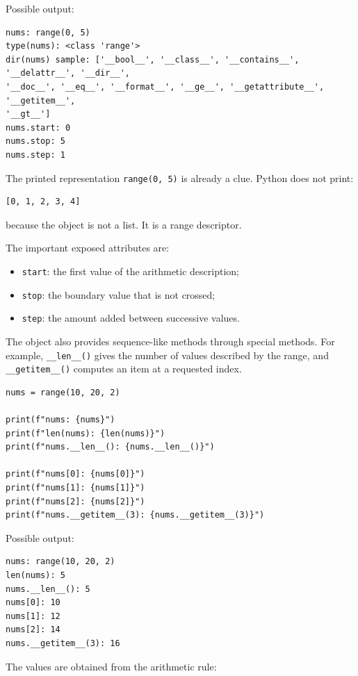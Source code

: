 \documentclass[a4paper,twoside]{report}
\begin{document}
Possible output:

\begin{verbatim}
nums: range(0, 5)
type(nums): <class 'range'>
dir(nums) sample: ['__bool__', '__class__', '__contains__', '__delattr__', '__dir__',
'__doc__', '__eq__', '__format__', '__ge__', '__getattribute__', '__getitem__',
'__gt__']
nums.start: 0
nums.stop: 5
nums.step: 1
\end{verbatim}

The printed representation \texttt{range(0, 5)} is already a clue. Python does not print:

\begin{verbatim}
[0, 1, 2, 3, 4]
\end{verbatim}

because the object is not a list. It is a range descriptor.

The important exposed attributes are:

\begin{itemize}
    \item \texttt{start}: the first value of the arithmetic description;
    \item \texttt{stop}: the boundary value that is not crossed;
    \item \texttt{step}: the amount added between successive values.
\end{itemize}

The object also provides sequence-like methods through special methods. For example, \texttt{\_\_len\_\_()} gives the number of values described by the range, and \texttt{\_\_getitem\_\_()} computes an item at a requested index.

\begin{verbatim}
nums = range(10, 20, 2)

print(f"nums: {nums}")
print(f"len(nums): {len(nums)}")
print(f"nums.__len__(): {nums.__len__()}")

print(f"nums[0]: {nums[0]}")
print(f"nums[1]: {nums[1]}")
print(f"nums[2]: {nums[2]}")
print(f"nums.__getitem__(3): {nums.__getitem__(3)}")
\end{verbatim}

Possible output:

\begin{verbatim}
nums: range(10, 20, 2)
len(nums): 5
nums.__len__(): 5
nums[0]: 10
nums[1]: 12
nums[2]: 14
nums.__getitem__(3): 16
\end{verbatim}

The values are obtained from the arithmetic rule:
\end{document}
